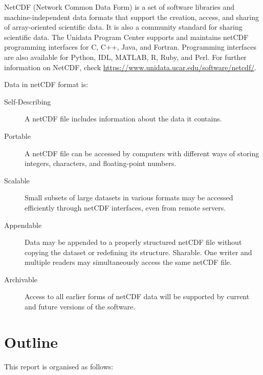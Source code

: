 NetCDF (Network Common Data Form) is a set of software libraries and machine-independent data formats that support the creation, access, and sharing of array-oriented scientific data. It is also a community standard for sharing scientific data. The Unidata Program Center supports and maintains netCDF programming interfaces for C, C++, Java, and Fortran. Programming interfaces are also available for Python, IDL, MATLAB, R, Ruby, and Perl. For further information on NetCDF, check \url{https://www.unidata.ucar.edu/software/netcdf/}.

Data in netCDF format is:

\begin{description}

\item[Self-Describing] A netCDF file includes information about the data it contains.

\item[Portable] A netCDF file can be accessed by computers with different ways of storing integers, characters, and floating-point numbers.

\item[Scalable] Small subsets of large datasets in various formats may be accessed efficiently through netCDF interfaces, even from remote servers.

\item[Appendable] Data may be appended to a properly structured netCDF file without copying the dataset or redefining its structure.
Sharable. One writer and multiple readers may simultaneously access the same netCDF file.

\item[Archivable] Access to all earlier forms of netCDF data will be supported by current and future versions of the software.

\end{description}

\section{Outline}

This report is organised as follows:

